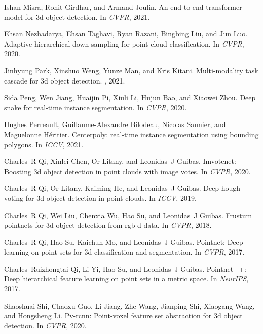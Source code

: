 \documentclass[final]{cvpr}
\begin{document}
{\begin{thebibliography}{10}
Ishan Misra, Rohit Girdhar, and Armand Joulin.
\newblock An end-to-end transformer model for 3d object detection.
\newblock In {\em CVPR}, 2021.

Ehsan Nezhadarya, Ehsan Taghavi, Ryan Razani, Bingbing Liu, and Jun Luo.
\newblock Adaptive hierarchical down-sampling for point cloud classification.
\newblock In {\em CVPR}, 2020.

Jinhyung Park, Xinshuo Weng, Yunze Man, and Kris Kitani.
\newblock Multi-modality task cascade for 3d object detection.
, 2021.

Sida Peng, Wen Jiang, Huaijin Pi, Xiuli Li, Hujun Bao, and Xiaowei Zhou.
\newblock Deep snake for real-time instance segmentation.
\newblock In {\em CVPR}, 2020.

Hughes Perreault, Guillaume-Alexandre Bilodeau, Nicolas Saunier, and Maguelonne
  H{\'e}ritier.
\newblock Centerpoly: real-time instance segmentation using bounding polygons.
\newblock In {\em ICCV}, 2021.

Charles~R Qi, Xinlei Chen, Or Litany, and Leonidas~J Guibas.
\newblock Imvotenet: Boosting 3d object detection in point clouds with image
  votes.
\newblock In {\em CVPR}, 2020.

Charles~R Qi, Or Litany, Kaiming He, and Leonidas~J Guibas.
\newblock Deep hough voting for 3d object detection in point clouds.
\newblock In {\em ICCV}, 2019.

Charles~R Qi, Wei Liu, Chenxia Wu, Hao Su, and Leonidas~J Guibas.
\newblock Frustum pointnets for 3d object detection from rgb-d data.
\newblock In {\em CVPR}, 2018.

Charles~R Qi, Hao Su, Kaichun Mo, and Leonidas~J Guibas.
\newblock Pointnet: Deep learning on point sets for 3d classification and
  segmentation.
\newblock In {\em CVPR}, 2017.

Charles~Ruizhongtai Qi, Li Yi, Hao Su, and Leonidas~J Guibas.
\newblock Pointnet++: Deep hierarchical feature learning on point sets in a
  metric space.
\newblock In {\em NeurIPS}, 2017.

Shaoshuai Shi, Chaoxu Guo, Li Jiang, Zhe Wang, Jianping Shi, Xiaogang Wang, and
  Hongsheng Li.
\newblock Pv-rcnn: Point-voxel feature set abstraction for 3d object detection.
\newblock In {\em CVPR}, 2020.


\end{thebibliography}}
\end{document}
